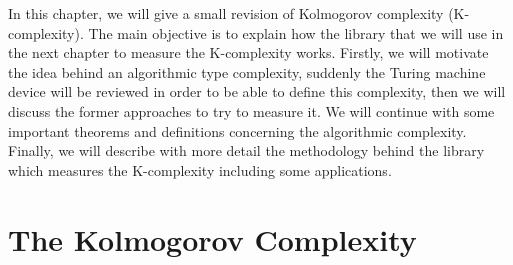 \label{algorithmic_complexity_chapter}

In this chapter, we will give a small revision of Kolmogorov complexity (K-complexity). The main objective is to explain how the library that we will use in the next chapter to measure the K-complexity works. Firstly, we will motivate the idea behind an algorithmic type complexity, suddenly the Turing machine device will be reviewed in order to be able to define this complexity, then we will discuss the former approaches to try to measure it. We will continue with some important theorems and definitions concerning the algorithmic complexity. Finally, we will describe with more detail the methodology behind the library which measures the K-complexity including some applications.

\section{The Kolmogorov Complexity}

